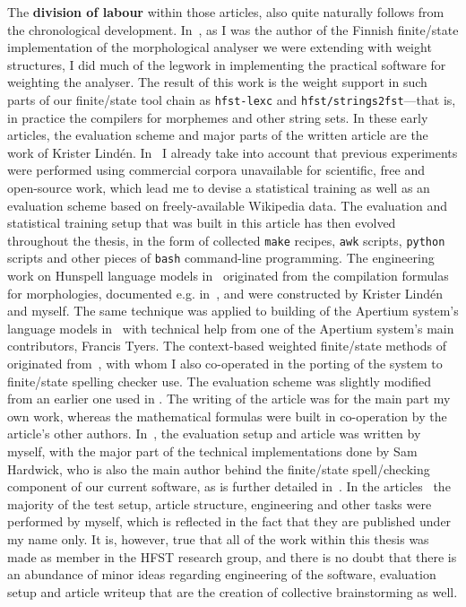 \documentclass[officiallayout]{unihelcompling}
\begin{document}
The \textbf{division of labour} within those articles, also quite naturally
follows from the chronological development.
In~, as I was the author
of the Finnish finite\-/state implementation of the morphological analyser we
were extending with weight structures, I did much of the legwork in
implementing the practical software for weighting the analyser. The result of
this work is the weight support in such parts of our finite\-/state tool chain
as \texttt{hfst-lexc} and \texttt{hfst\-/strings2fst}---that is, in practice
the compilers for morphemes and other string sets. In these early articles, the
evaluation scheme and major parts of the written article are the work of
Krister Lindén.  In~ I already take into
account that previous experiments were performed using commercial corpora
unavailable for scientific, free and open-source work, which lead me to devise
a statistical training as well as an evaluation scheme based on
freely-available Wikipedia data. The evaluation and statistical training setup
that was built in this article has then evolved throughout the thesis, in the
form of collected \texttt{make} recipes, \texttt{awk} scripts, \texttt{python}
scripts and other pieces of \texttt{bash} command-line programming. The
engineering work on Hunspell language models
in~ originated from the
compilation formulas for morphologies, documented e.g.\/
in~\cite{linden2009hfst}, and were constructed by Krister Lindén and myself.
The same technique was applied to building of the Apertium system's language
models in~ with technical help from one of the
Apertium system's main contributors, Francis Tyers.  The context-based weighted
finite\-/state methods of  originated
from~\citet{silfverberg2010partofspeech}, with whom I also co-operated in the
porting of the system to finite\-/state spelling checker use. The evaluation
scheme was slightly modified from an earlier one used in
. The writing of the article
 was for the main part  my own work, whereas
the mathematical formulas were built in co-operation by the article's other
authors.  In~, the evaluation setup and article
was written by myself, with the major part of the technical implementations done by
Sam Hardwick, who is also the main author behind the finite\-/state
spell\-/checking component of our current software, as is further detailed
in~\citet{linden2011hfst}.  In the
articles~ the majority
of the test setup, article structure, engineering and other tasks were
performed by myself, which is reflected in the fact that they are published
under my name only. It is, however, true that all of the work within this
thesis was made as member in the HFST research group, and there is no doubt
that there is an abundance of minor ideas regarding engineering of the
software, evaluation setup and article writeup that are the creation of
collective brainstorming as well.
\end{document}
